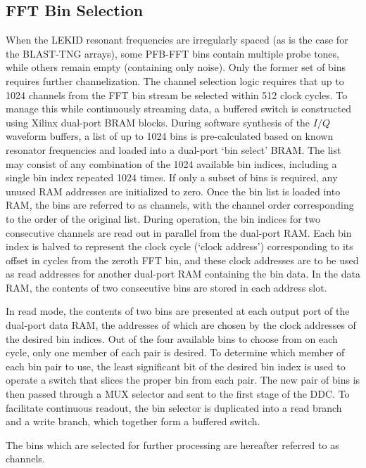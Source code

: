 \subsection{FFT Bin Selection}\label{bin select}

When the LEKID resonant frequencies are irregularly spaced (as is the case for the BLAST-TNG arrays), some PFB-FFT bins contain multiple probe tones, while others remain empty (containing only noise). Only the former set of bins requires further channelization. The channel selection logic requires that up to 1024 channels from the FFT bin stream be selected within 512 clock cycles. To manage this while continuously streaming data, a buffered switch is constructed using Xilinx dual-port BRAM blocks. During software synthesis of the $I/Q$ waveform buffers, a list of up to 1024 bins is pre-calculated based on known resonator frequencies and loaded into a dual-port `bin select' BRAM\@. The list may consist of any combination of the 1024 available bin indices, including a single bin index repeated 1024 times. If only a subset of bins is required, any unused RAM addresses are initialized to zero. Once the bin list is loaded into RAM, the bins are referred to as channels, with the channel order corresponding to the order of the original list. During operation, the bin indices for two consecutive channels are read out in parallel from the dual-port RAM\@. Each bin index is halved to represent the clock cycle (`clock address') corresponding to its offset in cycles from the zeroth FFT bin, and these clock addresses are to be used as read addresses for another dual-port RAM containing the bin data. In the data RAM, the contents of two consecutive bins are stored in each address slot.

In read mode, the contents of two bins are presented at each output port of the dual-port data RAM, the addresses of which are chosen by the clock addresses of the desired bin indices. Out of the four available bins to choose from on each cycle, only one member of each pair is desired. To determine which member of each bin pair to use, the least significant bit of the desired bin index is used to operate a switch that slices the proper bin from each pair. The new pair of bins is then passed through a MUX selector and sent to the first stage of the DDC\@. To facilitate continuous readout, the bin selector is duplicated into a read branch and a write branch, which together form a buffered switch.

The bins which are selected for further processing are hereafter referred to as channels.

